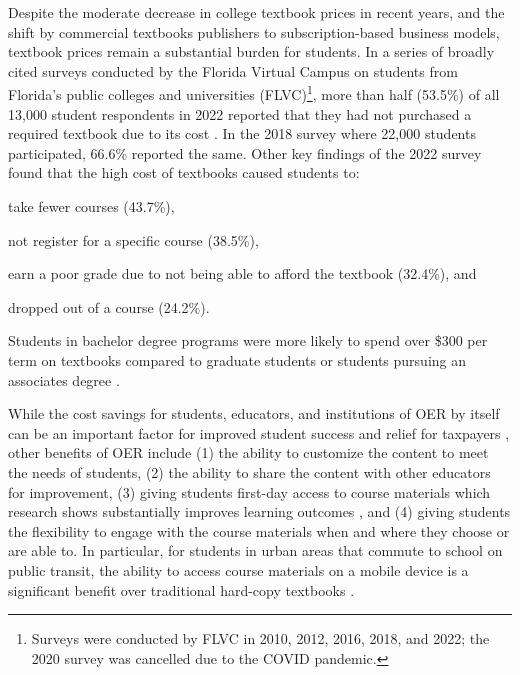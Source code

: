\documentclass[11pt]{article}
\begin{document}
Despite the moderate decrease in college textbook prices in recent years, and the shift by commercial textbooks publishers to subscription-based business models, textbook prices remain a substantial burden for students.  In a series of broadly cited surveys conducted by the Florida Virtual Campus on students from Florida's public colleges and universities (FLVC)\footnote{Surveys were conducted by FLVC in 2010, 2012, 2016, 2018, and 2022; the 2020 survey was cancelled due to the COVID pandemic.}, more than half (53.5\%) of all 13,000 student respondents in 2022 reported that they had not purchased a required textbook due to its cost \cite{flvc2022}. In the 2018 survey where 22,000 students participated, 66.6\% reported the same.  Other key findings of the 2022 survey found that the high cost of textbooks caused students to:
\begin{compactitem}
\item take fewer courses (43.7\%),
\item not register for a specific course (38.5\%),
\item earn a poor grade due to not being able to afford the textbook (32.4\%), and
\item dropped out of a course (24.2\%).
\end{compactitem}
Students in bachelor degree programs were more likely to spend over \$300 per term on textbooks compared to graduate students or students pursuing an associates degree \cite{flvc2022}.  

While the cost savings for students, educators, and institutions of OER by itself can be an important factor for improved student success and relief for taxpayers \cite{TB-JR-JH:13, RF-RP-BD:15, CW-DD-SC:17}, other benefits of OER include (1) the ability to customize the content to meet the needs of students, (2) the ability to share the content with other educators for improvement, (3) giving students first-day access to course materials which research shows substantially improves learning outcomes \cite{LA:2017}, and (4) giving students the flexibility to engage with the course materials when and where they choose or are able to.  In particular, for students in urban areas that commute to school on public transit, the ability to access course materials on a mobile device is a significant benefit over traditional hard-copy textbooks \cite{CC:17, MS:14}.
\end{document}
